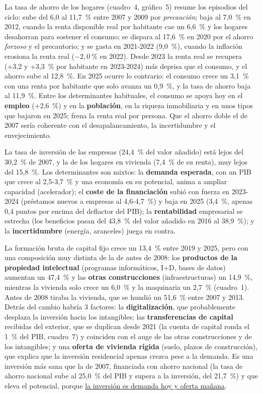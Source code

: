 \begin{examen}
La tasa de ahorro de los hogares (cuadro~4, gráfico~5) resume los episodios del ciclo: sube del 6,0 al 11,7~\% entre 2007 y 2009 por \emph{precaución}; baja al 7,0~\% en 2012, cuando la renta disponible real por habitante cae un 6,6~\% y los hogares desahorran para sostener el consumo; se dispara al 17,6~\% en 2020 por el ahorro \emph{forzoso} y el precautorio; y se gasta en 2021-2022 (9,0~\%), cuando la inflación erosiona la renta real ($-2{,}0~\%$ en 2022). Desde 2023 la renta real se recupera (+3,2 y +3,3~\% por habitante en 2023-2024) más deprisa que el consumo, y el ahorro sube al 12,8~\%. En 2025 ocurre lo contrario: el consumo crece un 3,1~\% con una renta por habitante que solo avanza un 0,9~\%, y la tasa de ahorro baja al 11,9~\%. Entre los determinantes habituales, el consumo se apoya hoy en el \textbf{empleo} (+2,6~\%) y en la \textbf{población}, en la riqueza inmobiliaria y en unos tipos que bajaron en 2025; frena la renta real por persona. Que el ahorro doble el de 2007 sería coherente con el desapalancamiento, la incertidumbre y el envejecimiento.

La tasa de inversión de las empresas (24,4~\% del valor añadido) está lejos del 30,2~\% de 2007, y la de los hogares en vivienda (7,4~\% de su renta), muy lejos del 15,8~\%. Los determinantes son mixtos: la \textbf{demanda esperada}, con un PIB que crece al 2,5-3,7~\% y una economía en su potencial, anima a ampliar capacidad (acelerador); el \textbf{coste de la financiación} subió con fuerza en 2023-2024 (préstamos nuevos a empresas al 4,6-4,7~\%) y baja en 2025 (3,4~\%, apenas 0,4 puntos por encima del deflactor del PIB); la \textbf{rentabilidad} empresarial se estrecha (los beneficios pasan del 43,8~\% del valor añadido en 2016 al 38,9~\%); y la \textbf{incertidumbre} (energía, aranceles) juega en contra.

La formación bruta de capital fijo crece un 13,4~\% entre 2019 y 2025, pero con una composición muy distinta de la de antes de 2008: los \textbf{productos de la propiedad intelectual} (programas informáticos, I+D, bases de datos) aumentan un 47,4~\% y las \textbf{otras construcciones} (infraestructuras) un 14,9~\%, mientras la vivienda solo crece un 6,0~\% y la maquinaria un 2,7~\% (cuadro~1). Antes de 2008 tiraba la vivienda, que se hundió un 51,6~\% entre 2007 y 2013. Detrás del cambio habría 3 factores: la \textbf{digitalización}, que probablemente desplaza la inversión hacia los intangibles; las \textbf{transferencias de capital} recibidas del exterior, que se duplican desde 2021 (la cuenta de capital ronda el 1~\% del PIB, cuadro~7) y coinciden con el auge de las otras construcciones y de los intangibles; y una \textbf{oferta de vivienda rígida} (suelo, plazos de construcción), que explica que la inversión residencial apenas crezca pese a la demanda. Es una inversión más sana que la de 2007, financiada con ahorro nacional (la tasa de ahorro nacional sube al 25,0~\% del PIB y supera a la inversión, del 21,7~\%) y que eleva el potencial, porque \uline{la inversión es demanda hoy y oferta mañana}.


\end{examen}

